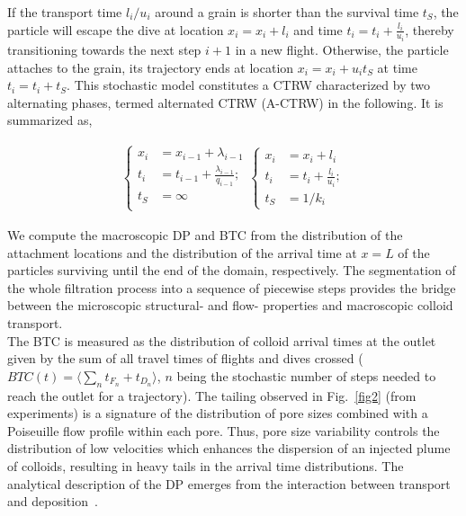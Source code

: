 \documentclass[singlecolumn,pre,notitlepage,preprintnumbers,floatfix,superscriptaddress]{revtex4-1}
\begin{document}
\noindent
If the transport time $l_i /u_i$ around a grain is shorter than the survival time $t_S$, the particle will escape the dive at location $x_i = x_{i} + l_{i}$ and time $t_i =t_{i} + \frac{l_{i}}{u_{i}}$, thereby transitioning towards the next step $i+1$ in a new flight. Otherwise, the particle attaches to the grain, its trajectory ends at location $x_i = x_i + u_{i} t_S$ at time $t_i = t_{i} + t_S$. This stochastic model constitutes a CTRW characterized by two alternating phases, termed alternated CTRW (A-CTRW) in the following. It is summarized as,

\begin{equation}
\begin{split}
 \left\{ \begin{array}{llll}
	x_i & = x_{i-1} + \lambda_{i-1} \\
	t_i & = t_{i-1} + \frac{\lambda_{i-1}}{q_{i-1}};\\
	t_S & = \infty \\
\end{array} \right.
\left\{ \begin{array}{ll}
	x_i & = x_{i} + l_{i} \\
	t_i & = t_{i} + \frac{l_{i}}{u_{i}};\\
	t_S & = 1/k_i
\end{array} \right.
\end{split}
\label{eq:CTRW}
\end{equation}

We compute the macroscopic DP and BTC from the distribution of the attachment locations and the distribution of the arrival time at $x = L$ of the particles surviving until the end of the domain, respectively. The segmentation of the whole filtration process into a sequence of piecewise steps provides the bridge between the microscopic structural- and flow- properties and macroscopic colloid transport. \\

\noindent
The BTC is measured as the distribution of colloid arrival times at the outlet given by the sum of all travel times of flights and dives crossed ($BTC(t)=\langle \sum_n t_{F_n} + t_{D_n}\rangle$, $n$ being the stochastic number of steps needed to reach the outlet for a trajectory). The tailing observed in Fig.~\ref{fig2} (from experiments) is a signature of the distribution of pore sizes combined with a Poiseuille flow profile within each pore. Thus, pore size variability controls the distribution of low velocities which enhances the dispersion of an injected plume of colloids, resulting in heavy tails in the arrival time distributions. The analytical description of the DP emerges from the interaction between transport and deposition~\cite{miele_stochastic_2019}. \\
\end{document}
